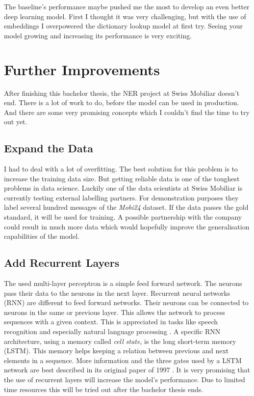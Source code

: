 The baseline's performance maybe pushed me the most to develop an even better deep learning model. First I thought it was very challenging, but with the use of embeddings I overpowered the dictionary lookup model at first try. Seeing your model growing and increasing its performance is very exciting.

\section{Further Improvements}

After finishing this bachelor thesis, the NER project at Swiss Mobiliar doesn't end. There is a lot of work to do, before the model can be used in production. And there are some very promising concepts which I couldn't find the time to try out yet.

\subsection{Expand the Data}

I had to deal with a lot of overfitting. The best solution for this problem is to increase the training data size. But getting reliable data is one of the toughest problems in data science. Luckily one of the data scientists at Swiss Mobiliar is currently testing external labelling partners. For demonstration purposes they label several hundred messages of the \emph{Mobi24} dataset. If the data passes the gold standard, it will be used for training. A possible partnership with the company could result in much more data which would hopefully improve the generalisation capabilities of the model.

\subsection{Add Recurrent Layers}

The used multi-layer perceptron is a simple feed forward network. The neurons pass their data to the neurons in the next layer. Recurrent neural networks (RNN) are different to feed forward networks. Their neurons can be connected to neurons in the same or previous layer. This allows the network to process sequences with a given context. This is appreciated in tasks like speech recognition and especially natural language processing \cite{wiki07}. A specific RNN architecture, using a memory called \emph{cell state}, is the long short-term memory (LSTM). This memory helps keeping a relation between previous and next elements in a sequence. More information and the three gates used by a LSTM network are best described in its original paper of 1997 \cite{lstm97}. It is very promising that the use of recurrent layers will increase the model's performance. Due to limited time resources this will be tried out after the bachelor thesis ends.

